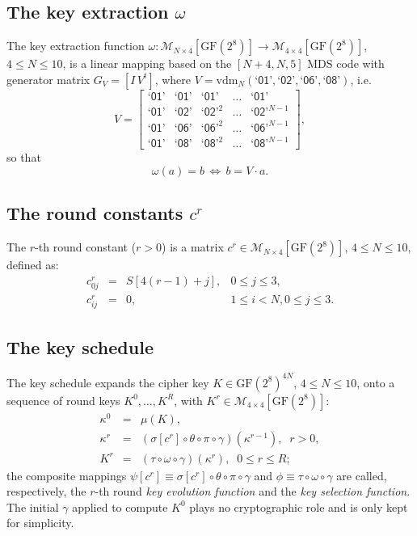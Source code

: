 \documentclass{llncs}
\newcommand{\GF}{\mathrm{GF}}
\newcommand{\vdm}{\mathrm{vdm}}
\newcommand{\matrices}[2]{\mathcal{M}_{#1 \times #2}[\GF(2^8)]}
\newcommand{\gf}[1]{\textsf{`#1'}}
\begin{document}
\subsection{The key extraction $\omega$}

The key extraction function $\omega: \matrices{N}{4} \rightarrow
\matrices{4}{4}$, $4 \leqslant N \leqslant 10$, is a linear
mapping based on the $[N+4, N, 5]$ MDS code with generator matrix
$G_V = [I \, V^t]$, where $V = \vdm_N(\gf{01}, \gf{02}, \gf{06},
\gf{08})$, i.e.
\[
V = \left[\begin{array}{lllcl} %
\gf{01} & \gf{01} & \gf{01}^{} & \dots & \gf{01}^{}\\
\gf{01} & \gf{02} & \gf{02}^2 & \dots & \gf{02}^{N-1}\\
\gf{01} & \gf{06} & \gf{06}^2 & \dots & \gf{06}^{N-1}\\
\gf{01} & \gf{08} & \gf{08}^2 & \dots & \gf{08}^{N-1}
\end{array}\right],
\]
so that
\[
\omega(a) = b \,\Leftrightarrow\, b = V \cdot a.
\]

\subsection{The round constants $c^r$}\label{round-const}

The $r$-th round constant ($r > 0$) is a matrix $c^r \in
\matrices{N}{4}$, $4 \leqslant N \leqslant 10$, defined as:
\[
\begin{array}{lcll}
c_{0j}^r & = & S[4(r - 1) + j], & 0 \leqslant j \leqslant 3,\\
c_{ij}^r & = & 0, & 1 \leqslant i < N, 0 \leqslant j \leqslant 3.
\end{array}
\]

\subsection{The key schedule}

The key schedule expands the cipher key $K \in \GF(2^8)^{4N}$, $4
\leqslant N \leqslant 10$, onto a sequence of round keys $K^0,
\dots, K^R$, with $K^r \in \matrices{4}{4}$:
\begin{eqnarray*}
\kappa^0 & = & \mu(K),\\
\kappa^r & = & (\sigma[c^r] \circ \theta
\circ \pi \circ \gamma)(\kappa^{r-1}), \;\; r > 0,\\
K^r & = & (\tau \circ \omega \circ \gamma)(\kappa^r), \;\; 0
\leqslant r \leqslant R;
\end{eqnarray*}
the composite mappings $\psi[c^r] \equiv \sigma[c^r] \circ \theta
\circ \pi \circ \gamma$ and $\phi \equiv \tau \circ \omega \circ
\gamma$ are called, respectively, the $r$-th round \emph{key
evolution function} and the \emph{key selection function}. The
initial $\gamma$ applied to compute $K^0$ plays no cryptographic
role and is only kept for simplicity.
\end{document}
